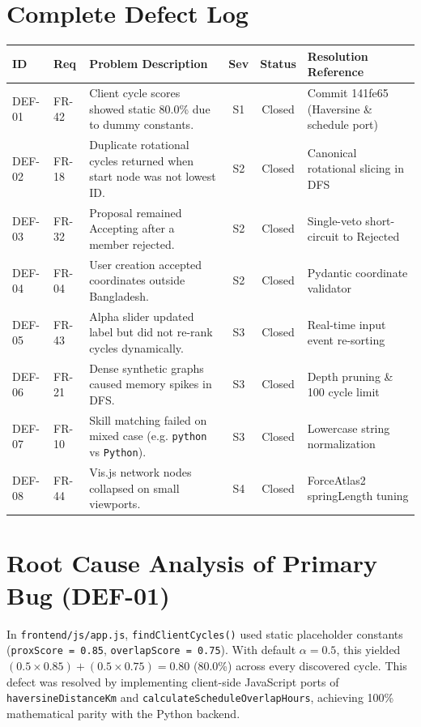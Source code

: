 \documentclass[12pt,a4paper]{report}
\begin{document}
\section{Complete Defect Log}
\begin{table}[ht]
\centering
\small
\begin{tabularx}{\textwidth}{l l X c c l}
\toprule
\textbf{ID} & \textbf{Req} & \textbf{Problem Description} & \textbf{Sev} & \textbf{Status} & \textbf{Resolution Reference} \\
\midrule
DEF-01 & FR-42 & Client cycle scores showed static 80.0\% due to dummy constants. & S1 & Closed & Commit 141fe65 (Haversine \& schedule port) \\
DEF-02 & FR-18 & Duplicate rotational cycles returned when start node was not lowest ID. & S2 & Closed & Canonical rotational slicing in DFS \\
DEF-03 & FR-32 & Proposal remained Accepting after a member rejected. & S2 & Closed & Single-veto short-circuit to Rejected \\
DEF-04 & FR-04 & User creation accepted coordinates outside Bangladesh. & S2 & Closed & Pydantic coordinate validator \\
DEF-05 & FR-43 & Alpha slider updated label but did not re-rank cycles dynamically. & S3 & Closed & Real-time input event re-sorting \\
DEF-06 & FR-21 & Dense synthetic graphs caused memory spikes in DFS. & S3 & Closed & Depth pruning \& 100 cycle limit \\
DEF-07 & FR-10 & Skill matching failed on mixed case (e.g. \texttt{python} vs \texttt{Python}). & S3 & Closed & Lowercase string normalization \\
DEF-08 & FR-44 & Vis.js network nodes collapsed on small viewports. & S4 & Closed & ForceAtlas2 springLength tuning \\
\bottomrule
\end{tabularx}
\end{table}

\section{Root Cause Analysis of Primary Bug (DEF-01)}
In \texttt{frontend/js/app.js}, \texttt{findClientCycles()} used static placeholder constants (\texttt{proxScore = 0.85}, \texttt{overlapScore = 0.75}). With default $\alpha = 0.5$, this yielded $(0.5 \times 0.85) + (0.5 \times 0.75) = 0.80$ (80.0\%) across every discovered cycle. This defect was resolved by implementing client-side JavaScript ports of \texttt{haversineDistanceKm} and \texttt{calculateScheduleOverlapHours}, achieving 100\% mathematical parity with the Python backend.
\end{document}
